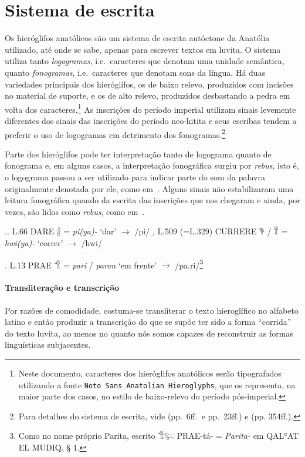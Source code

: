 
\section{Sistema de escrita}

Os hieróglifos anatólicos são um sistema de escrita autóctone da Anatólia
utilizado, até onde se sabe, apenas para escrever textos em luvita.
O sistema utiliza tanto \emph{logogramas}, i.e.\ caracteres que denotam uma
unidade semântica, quanto \emph{fonogramas}, i.e.\ caracteres que denotam sons da
língua.
Há duas variedades principais dos hieróglifos, os de baixo relevo, produzidos
com incisões no material de suporte, e os de alto relevo, produzidos
desbastando a pedra em volta dos caracteres.\footnote{Neste documento,
	caracteres dos hieróglifos anatólicos serão tipografados utilizando a fonte
		{\tiny\texttt{Noto Sans Anatolian Hieroglyphs}}, que os representa, na
	maior parte dos casos, no estilo de
	baixo-relevo do período pós\hyp{}imperial.}
As inscrições do período imperial utilizam sinais levemente diferentes dos
sinais das inscrições do período neo-hitita e seus escribas tendem a preferir
o uso de logogramas em detrimento dos fonogramas.\footnote{%
	Para detalhes do sistema de escrita, vide
	 (pp.\ 6ff.\ e pp.\ 23ff.) e  (pp. 354ff.).
}


Parte dos hieróglifos pode ter interpretação tanto de logograma quanto de
fonograma e, em alguns casos, a interpretação fonográfica surgiu por
\emph{rebus}, isto é, o logograma passou a ser utilizado para indicar parte do
som da palavra originalmente denotada por ele, como em~\Next.
Alguns sinais não estabilizaram uma leitura fonográfica quando da escrita das
inscrições que nos chegaram e ainda, por vezes, são lidos como \emph{rebus},
como em~\NNext.

\ex.\a. L.66 DARE 𔑈 = \emph{pi{(ya)}-} `dar' $\rightarrow$ /pi/
\b. L.509 (=L.329) CURRERE 𔘰 \slash{} 𔕰 = \emph{hwi{(ya)}-} `correr' $\rightarrow$
/hwi/

\ex. L.13 PRAE 𔐎 = \emph{pari} \slash{} \emph{paran} `em frente' $\rightarrow$
/pa.ri/\footnote{Como no nome próprio Parita, escrito 𔐎𔐞 PRAE-tá- =
	\emph{Parita-} em QAL\textsc{ʿ}AT EL MUDIQ, § 1.}

\paragraph{Transliteração e transcrição}
Por razões de comodidade, costuma-se transliterar o texto hieroglífico no
alfabeto latino e então produzir a transcrição do que se supõe ter sido a
forma ``corrida'' do texto luvita, ao menos no quanto nós somos capazes de
reconstruir as formas linguísticas subjacentes.

